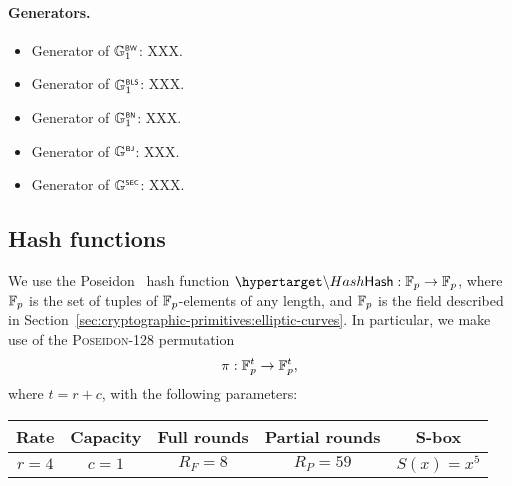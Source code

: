 \paragraph{Generators.}
\begin{itemize}
	\item Generator of ${\mathbb{G}}^{\text{\tiny \sf BW}}_1$: XXX.
	\item Generator of ${\mathbb{G}}^{\text{\tiny \sf BLS}}_1$: XXX.
	\item Generator of ${\mathbb{G}}^{\text{\tiny \sf BN}}_1$: XXX.
	\item Generator of ${\mathbb{G}}^{\text{\tiny \sf BJ}}$: XXX.
	\item Generator of ${\mathbb{G}}^{\text{\tiny \sf SEC}}$: XXX.
\end{itemize}

\subsection{Hash functions}
\label{sec:cryptographic-primitives:hash}



We use the Poseidon~\cite{grassi21poseidon} hash function $ \hlset{\Hash} : \F_p \rightarrow \F_p$, where $\mathbb{F}_p$ is the set of tuples of $\mathbb{F}_p$-elements of any length, and $\mathbb{F}_p$ is the field described in Section~\ref{sec:cryptographic-primitives:elliptic-curves}. In particular, we make use of the \textsc{Poseidon-128} permutation \[\pi: \mathbb{F}_p^t\rightarrow \mathbb{F}_p^t,\] where $t=r+c$, with the following parameters:
\begin{table}[H]
	\begin{center}
		\begin{tabular}{| c | c | c | c | c | }
			\hline
			Rate & Capacity  & Full rounds & Partial rounds & S-box \\
			\hline
			$r=4$ & $c=1$ & $R_F=8$ & $R_P=59$ & $S(x)=x^5$ \\
			\hline		
		\end{tabular}
	\end{center}
\end{table}


